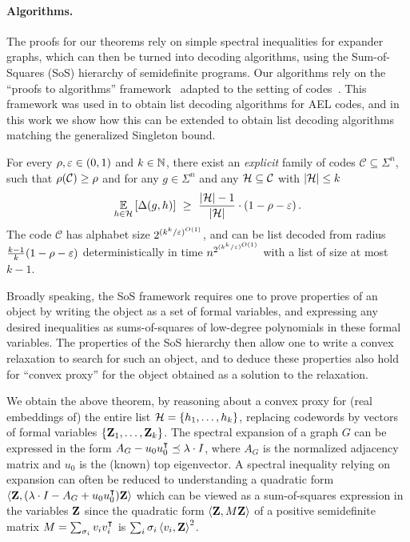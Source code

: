 \paragraph{Algorithms.}
%
The proofs for our theorems rely on simple spectral inequalities for expander graphs, which can then
be turned into decoding algorithms, using the Sum-of-Squares (SoS) hierarchy of semidefinite
programs.  
%
Our algorithms rely on the ``proofs to algorithms'' framework~\cite{FKP19} adapted to the setting of codes~\cite{JST23}.
%
This framework was used in \cite{JST23} to obtain list decoding algorithms for AEL codes, and in
this work we show how this can be extended to obtain list decoding algorithms matching the
generalized Singleton bound. 
%
%
\begin{theorem}\label{thm:algo-intro}
%
For every $\rho, \varepsilon \in (0,1)$ and $k \in {\mathbb{N}}$, there exist an \emph{explicit} family of codes $\mathcal{C} \subseteq \Sigma^n$, such that $\rho({\mathcal C}) \geq \rho$ and
for any $g \in  \Sigma^n$ and any ${\mathcal H} \subseteq \mathcal{C}$ with $\lvert{\mathcal H}\rvert \leq k$ 
\[
\Ex{h \in \calH}{\Delta(g,h)} ~\geq~ \frac{\abs{\calH}-1}{\abs{\calH}} \cdot (1 - \rho - \eps) \mper
\]
%
The code  $\mathcal{C}$ has alphabet size  $2^{(k^k/\varepsilon)^{O(1)}}$, and can be list decoded from
radius $\frac{k-1}{k}(1-\rho-\varepsilon)$ deterministically in time $n^{2^{(k^k/\varepsilon)^{O(1)}}}$ with a
list of size at most $k-1$.
%
\end{theorem} 
%
Broadly speaking, the SoS framework requires one to prove properties of an object by writing the
object as a set of formal variables, and expressing any desired inequalities as sums-of-squares of
low-degree polynomials in these formal variables.
%
The properties of the SoS hierarchy then allow one to write a convex relaxation to search for such an object,
and to deduce these properties also hold for ``convex proxy'' for the object obtained as a solution
to the relaxation.

We obtain the above theorem, by reasoning about a convex proxy for (real embeddings of) the entire list ${\mathcal H} =
\left\{h_1, \ldots, h_k\right\}$, replacing codewords by vectors of formal variables $\left\{{ \mathbf{Z} }_1,
  \ldots, { \mathbf{Z} }_k\right\}$.
%
The spectral expansion of a graph $G$ can be expressed in the form $A_G - u_0
u_0^{\intercal} \preceq \lambda \cdot I$, where $A_G$ is the normalized adjacency matrix and $u_0$ is the
(known) top eigenvector.
%
A spectral inequality relying on expansion can often be reduced to understanding a quadratic form
$\left\langle { \mathbf{Z} } , (\lambda \cdot I - A_G + u_0 u_0^{\intercal}) { \mathbf{Z} } \right\rangle$ which can be viewed as a sum-of-squares
expression in the variables ${ \mathbf{Z} }$ since the quadratic form $\left\langle { \mathbf{Z} } , M{ \mathbf{Z} } \right\rangle$ of a positive
semidefinite matrix $M = \sum_{\sigma_i} v_i v_i^{\intercal}$ is $\sum_{i} \sigma_i \left\langle v_i , { \mathbf{Z} } \right\rangle^2$.

